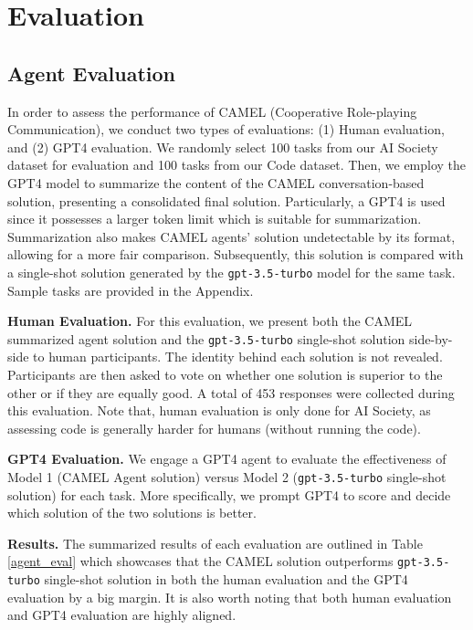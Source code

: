 \section{Evaluation}


\subsection{Agent Evaluation}\label{eval1}


In order to assess the performance of CAMEL (Cooperative Role-playing Communication), we conduct two types of evaluations: (1) Human evaluation, and (2) GPT4 evaluation. We randomly select 100 tasks from our AI Society dataset for evaluation and 100 tasks from our Code dataset. Then, we employ the GPT4 model to summarize the content of the CAMEL conversation-based solution, presenting a consolidated final solution. Particularly, a GPT4 is used since it possesses a larger token limit which is suitable for summarization. Summarization also makes CAMEL agents' solution undetectable by its format, allowing for a more fair comparison. Subsequently, this solution is compared with a single-shot solution generated by the \texttt{gpt-3.5-turbo} model for the same task. Sample tasks are provided in the Appendix.


\textbf{Human Evaluation.} For this evaluation, we present both the CAMEL summarized agent solution and the \texttt{gpt-3.5-turbo} single-shot solution side-by-side to human participants. The identity behind each solution is not revealed. Participants are then asked to vote on whether one solution is superior to the other or if they are equally good. A total of 453 responses were collected during this evaluation. Note that, human evaluation is only done for AI Society, as assessing code is generally harder for humans (without running the code).

\textbf{GPT4 Evaluation.} We engage a GPT4 agent to evaluate the effectiveness of Model 1 (CAMEL Agent solution) versus Model 2 (\texttt{gpt-3.5-turbo} single-shot solution) for each task. More specifically, we prompt GPT4 to score and decide which solution of the two solutions is better.

\textbf{Results.} The summarized results of each evaluation are outlined in Table \ref{agent_eval} which showcases that the CAMEL solution outperforms \texttt{gpt-3.5-turbo} single-shot solution in both the human evaluation and the GPT4 evaluation by a big margin. It is also worth noting that both human evaluation and GPT4 evaluation are highly aligned. 


